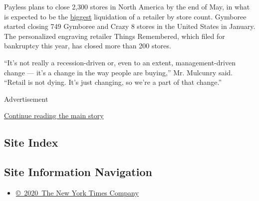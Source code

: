 Payless plans to close 2,300 stores in North America by the end of May,
in what is expected to be the
\href{https://www.payless.com/on/demandware.static/-/Sites-payless-Library/default/dwdd7f9484/documents/payless-restructure-pr-store-closing-sales-02-28-2019.pdf}{biggest}
liquidation of a retailer by store count. Gymboree started closing 749
Gymboree and Crazy 8 stores in the United States in January. The
personalized engraving retailer Things Remembered, which filed for
bankruptcy this year, has closed more than 200 stores.

``It's not really a recession-driven or, even to an extent,
management-driven change --- it's a change in the way people are
buying,'' Mr. Mulcunry said. ``Retail is not dying. It's just changing,
so we're a part of that change.''

Advertisement

\protect\hyperlink{after-bottom}{Continue reading the main story}

\hypertarget{site-index}{%
\subsection{Site Index}\label{site-index}}

\hypertarget{site-information-navigation}{%
\subsection{Site Information
Navigation}\label{site-information-navigation}}

\begin{itemize}
\tightlist
\item
  \href{https://help.nytimes3xbfgragh.onion/hc/en-us/articles/115014792127-Copyright-notice}{©~2020~The
  New York Times Company}
\end{itemize}

